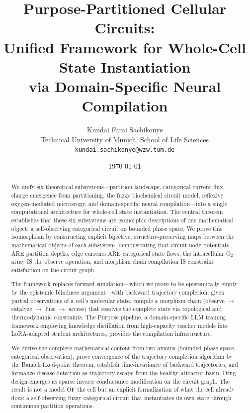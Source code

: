 \documentclass[twocolumn,10pt,a4paper]{article}
\theoremstyle{definition}
\theoremstyle{remark}
\begin{document}
\title{\textbf{Purpose-Partitioned Cellular Circuits:\\[4pt]
Unified Framework for Whole-Cell State Instantiation\\
via Domain-Specific Neural Compilation}}

\author{
Kundai Farai Sachikonye\\
Technical University of Munich, School of Life Sciences\\
\texttt{kundai.sachikonye@wzw.tum.de}
}

\date{\today}

\maketitle

\begin{abstract}
\noindent We unify six theoretical subsystems---partition landscape, categorical current flux, charge emergence from partitioning, the fuzzy biochemical circuit model, reflexive oxygen-mediated microscopy, and domain-specific neural compilation---into a single computational architecture for whole-cell state instantiation. The central theorem establishes that these six subsystems are isomorphic descriptions of one mathematical object: a self-observing categorical circuit on bounded phase space. We prove this isomorphism by constructing explicit bijective, structure-preserving maps between the mathematical objects of each subsystem, demonstrating that circuit node potentials ARE partition depths, edge currents ARE categorical state flows, the intracellular O$_2$ array IS the observe operation, and morphism chain compilation IS constraint satisfaction on the circuit graph.

The framework replaces forward simulation---which we prove to be epistemically empty by the epistemic blindness argument---with backward trajectory completion: given partial observations of a cell's molecular state, compile a morphism chain (observe $\to$ catalyze $\to$ fuse $\to$ access) that resolves the complete state via topological and thermodynamic constraints. The Purpose pipeline, a domain-specific LLM training framework employing knowledge distillation from high-capacity teacher models into LoRA-adapted student architectures, provides the compilation infrastructure.

We derive the complete mathematical content from two axioms (bounded phase space, categorical observation), prove convergence of the trajectory completion algorithm by the Banach fixed-point theorem, establish time-invariance of backward trajectories, and formalize disease detection as trajectory escape from the healthy attractor basin. Drug design emerges as sparse inverse conductance modification on the circuit graph. The result is not a model OF the cell but an explicit formalization of what the cell already does: a self-observing fuzzy categorical circuit that instantiates its own state through continuous partition operations.
\end{abstract}
\end{document}
